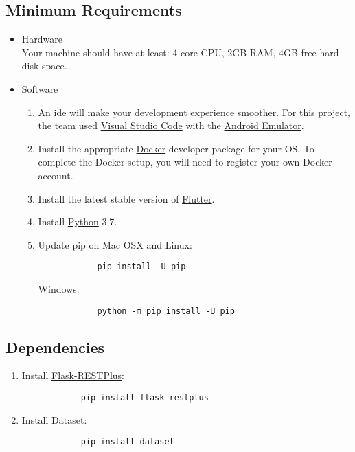 \documentclass{article}
\begin{document}
    \subsection{Minimum Requirements}
    \begin{itemize}
        \item Hardware \\[6pt]
        Your machine should have at least: 4-core CPU, 2GB RAM, 4GB free hard disk space.
        
        \item Software
        \begin{enumerate}
            \item An \acrshort{ide} will make your development experience smoother. For this project, the team used \hyperlink{https://code.visualstudio.com/}{Visual Studio Code} with the \hyperlink{https://developer.android.com/studio/run/emulator}{Android Emulator}.
            \item  Install the appropriate \hyperlink{https://www.docker.com/get-started}{Docker} developer package for your OS. To complete the Docker setup, you will need to register your own Docker account.
            \item  Install the latest stable version of \hyperlink{https://flutter.dev/docs/get-started/install}{Flutter}.
            \item Install \hyperlink{https://www.python.org/downloads/}{Python} 3.7.
            \item Update pip on Mac OSX and Linux: 
            \begin{verbatim}
            pip install -U pip
            \end{verbatim}
            Windows: 
            \begin{verbatim}
            python -m pip install -U pip
            \end{verbatim}
        \end{enumerate}
    \end{itemize}
    
        \subsection{Dependencies}
        \begin{enumerate}
            \item Install \hyperlink{https://flask-restplus.readthedocs.io/en/stable/index.html}{Flask-RESTPlus}: 
            \begin{verbatim}
            pip install flask-restplus
            \end{verbatim}
            \item Install \hyperlink{https://dataset.readthedocs.io/en/latest/quickstart.html}{Dataset}:
            \begin{verbatim}
            pip install dataset
            \end{verbatim}
        \end{enumerate}
        
\end{document}
